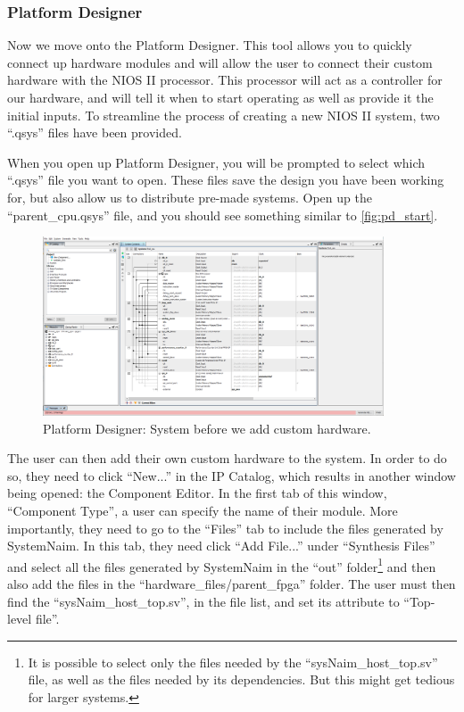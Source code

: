 \subsubsection{Platform Designer}

Now we move onto the Platform Designer. This tool allows you to quickly connect up hardware modules and will allow the user to connect their custom hardware with the NIOS II processor. This processor will act as a controller for our hardware, and will tell it when to start operating as well as provide it the initial inputs. To streamline the process of creating a new NIOS II system, two “.qsys” files have been provided. 

When you open up Platform Designer, you will be prompted to select which “.qsys” file you want to open. These files save the design you have been working for, but also allow us to distribute pre-made systems. Open up the “parent\_cpu.qsys” file, and you should see something similar to \autoref{fig:pd_start}.

\begin{figure}[!htb]
    \centering
    \includegraphics[width=0.9\textwidth]{05_evaluation/images/pd_no_module.png}
    \caption{Platform Designer: System before we add custom hardware.}
    \label{fig:pd_start}
\end{figure}

The user can then add their own custom hardware to the system. In order to do so, they need to click “New...” in the IP Catalog, which results in another window being opened: the Component Editor. In the first tab of this window, “Component Type”, a user can specify the name of their module. More importantly, they need to go to the “Files” tab to include the files generated by SystemNaim. In this tab, they need click “Add File...” under “Synthesis Files” and select all the files generated by SystemNaim in the “out” folder\footnote{It is possible to select only the files needed by the “sysNaim\_host\_top.sv” file, as well as the files needed by its dependencies. But this might get tedious for larger systems.} and then also add the files in the “hardware\_files/parent\_fpga” folder. The user must then find the “sysNaim\_host\_top.sv”, in the file list, and set its attribute to “Top-level file”. 

